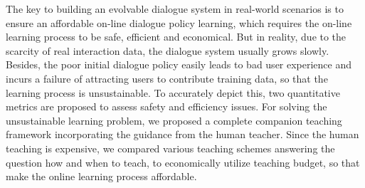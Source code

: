 The key to building an evolvable dialogue system in real-world scenarios is to ensure an affordable on-line dialogue policy learning, which requires the on-line learning process to be safe, efficient and economical. But in reality, due to the scarcity of real interaction data, the dialogue system usually grows slowly. Besides, the poor initial dialogue policy easily leads to bad user experience and incurs a failure of attracting users to contribute training data, so that the learning process is unsustainable. To accurately depict this, two quantitative metrics are proposed to assess safety and efficiency issues. For solving the unsustainable learning problem, we proposed a complete companion teaching framework incorporating the guidance from the human teacher. Since the human teaching is expensive, we compared various teaching schemes answering the question how and when to teach, to economically utilize teaching budget, so that make the online learning process affordable.
